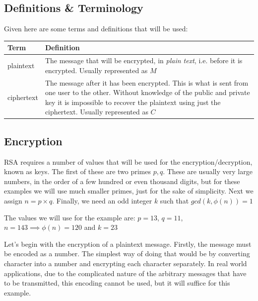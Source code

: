 \documentclass[12pt]{article}
\begin{document}
    \subsection{Definitions \& Terminology}
    Given here are some terms and definitions that will be used:
    \begin{table}[H]
        \begin{tabular}{ | m{5em} | p{30em} | }
            \hline
            Term      & Definition\\
            \hline
            plaintext & The message that will be encrypted, in \emph{plain
                        text}, i.e. before it is encrypted. Usually represented as $M$\\
            \hline
            ciphertext & The message after it has been encrypted. This is what
                         is sent from one user to the other. Without
                         knowledge of the public and private key it is
                         impossible to recover the plaintext using just the
                         ciphertext. Usually represented as $C$\\
            \hline
        \end{tabular}
    \end{table}
    \subsection{Encryption}
    RSA requires a number of values that will be used for the
    encryption/decryption, known as keys.  The first of these are two primes
    $p,q$. These are usually very large numbers, in the order of a few hundred
    or even thousand digits, but for these examples we will use much smaller
    primes, just for the sake of simplicity. Next we assign $n=p \times q$.
    Finally, we need an odd integer $k$ such that $gcd(k, \phi (n)) = 1$ 

    The values we will use for the example are: $p=13$, $q=11$, $n=143 \implies
    \phi (n) = 120$ and $k = 23$

    Let's begin with the encryption of a plaintext message. Firstly, the message
    must be encoded as a number. The simplest way of doing that would be by
    converting character into a number and encrypting each character separately.
    In real world applications, due to the complicated nature of the arbitrary
    messages that have to be transmitted, this encoding cannot be used, but it
    will suffice for this example.
\end{document}
